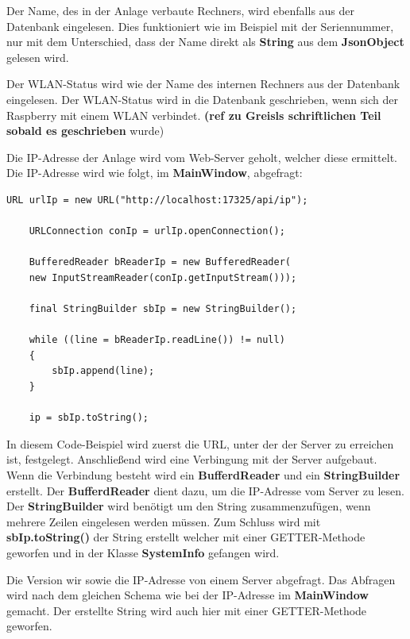 \vspace{10pt}

Der Name, des in der Anlage verbaute Rechners, wird ebenfalls aus der Datenbank eingelesen. Dies funktioniert wie im Beispiel mit der Seriennummer, nur mit dem Unterschied, dass der Name direkt als \textbf{String} aus dem \textbf{JsonObject} gelesen wird. 

\vspace{10pt}

Der WLAN-Status wird wie der Name des internen Rechners aus der Datenbank eingelesen. Der WLAN-Status wird in die Datenbank geschrieben, wenn sich der Raspberry mit einem WLAN verbindet. \textbf{(ref zu Greisls schriftlichen Teil sobald es geschrieben} wurde)

\vspace{10pt}

Die IP-Adresse der Anlage wird vom Web-Server geholt, welcher diese ermittelt. Die IP-Adresse wird wie folgt, im \textbf{MainWindow}, abgefragt:
\begin{lstlisting}[style=JavaStyle, caption=Abfragen der IP-Adresse]
	URL urlIp = new URL("http://localhost:17325/api/ip");
	
	URLConnection conIp = urlIp.openConnection();
	
	BufferedReader bReaderIp = new BufferedReader(
	new InputStreamReader(conIp.getInputStream()));    
	
	final StringBuilder sbIp = new StringBuilder();
	
	while ((line = bReaderIp.readLine()) != null)
    {
        sbIp.append(line);
    }
            
    ip = sbIp.toString();    
\end{lstlisting}
In diesem Code-Beispiel wird zuerst die URL, unter der der Server zu erreichen ist, festgelegt. Anschließend wird eine Verbingung mit der Server aufgebaut. Wenn die Verbindung besteht wird ein \textbf{BufferdReader} und ein \textbf{StringBuilder} erstellt. Der \textbf{BufferdReader} dient dazu, um die IP-Adresse vom Server zu lesen. Der \textbf{StringBuilder} wird benötigt um den String zusammenzufügen, wenn mehrere Zeilen eingelesen werden müssen. Zum Schluss wird mit \textbf{sbIp.toString()} der String erstellt welcher mit einer GETTER-Methode geworfen und in der Klasse \textbf{SystemInfo} gefangen wird.

\vspace{10pt}

Die Version wir sowie die IP-Adresse von einem Server abgefragt. Das Abfragen wird nach dem gleichen Schema wie bei der IP-Adresse im \textbf{MainWindow} gemacht. Der erstellte String wird auch hier mit einer GETTER-Methode geworfen.


